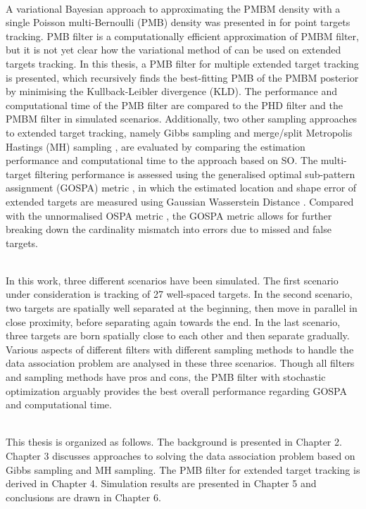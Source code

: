 ~\\
A variational Bayesian approach to approximating the PMBM density with a single Poisson multi-Bernoulli (PMB) density was presented in \cite{variational} for point targets tracking. PMB filter is a computationally efficient approximation of PMBM filter, but it is not yet clear how the variational method of \cite{variational} can be used on extended targets tracking. In this thesis, a PMB filter for multiple extended target tracking is presented, which recursively finds the best-fitting PMB of the PMBM posterior by minimising the Kullback-Leibler divergence (KLD). The performance and computational time of the PMB filter are compared to the PHD filter and the PMBM filter in simulated scenarios. Additionally, two other sampling approaches to extended target tracking, namely Gibbs sampling \cite{gibbs} and merge/split Metropolis Hastings (MH) sampling \cite{mergesplit}, are evaluated by comparing the estimation performance and computational time to the approach based on SO. The multi-target filtering performance is assessed using the generalised optimal sub-pattern assignment (GOSPA) metric \cite{gospa}, in which the estimated location and shape error of extended targets are measured using Gaussian Wasserstein Distance \cite{gwmetric}. Compared with the unnormalised OSPA metric \cite{ospa}, the GOSPA metric allows for further breaking down the cardinality mismatch into errors due to missed and false targets. 

~\\
In this work, three different scenarios have been simulated. The first scenario under consideration is tracking of 27 well-spaced targets. In the second scenario, two targets are spatially well separated at the beginning, then move in parallel in close proximity, before separating again towards the end. In the last scenario, three targets are born spatially close to each other and then separate gradually. Various aspects of different filters with different sampling methods to handle the data association problem are analysed in these three scenarios. Though all filters and sampling methods have pros and cons, the PMB filter with stochastic optimization arguably provides the best overall performance regarding GOSPA and computational time. 

~\\
This thesis is organized as follows. The background is presented in Chapter 2. Chapter 3 discusses approaches to solving the data association problem based on Gibbs sampling and MH sampling. The PMB filter for extended target tracking is derived in Chapter 4. Simulation results are presented in Chapter 5 and conclusions are drawn in Chapter 6. 

